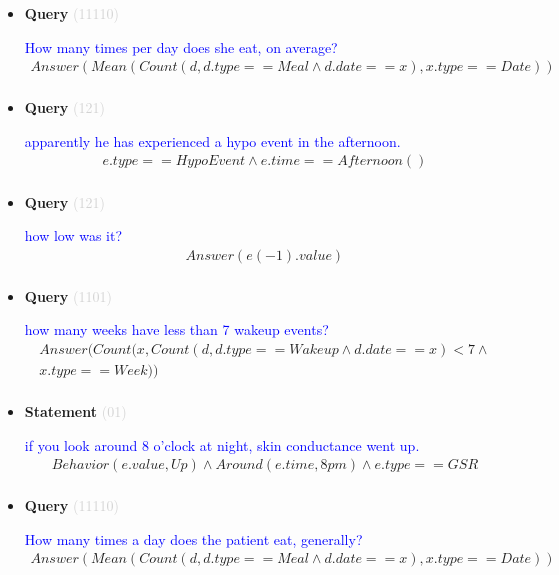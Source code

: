 \documentclass[11pt]{article}
\newcommand{\key}[1]{\textcolor{lightgray}{#1}}
\newcounter{CQuery}
\newcounter{CStatement}
\begin{document}
\begin{itemize}
\item
\textbf{Query\theCQuery} \key{(11110)} \addtocounter{CQuery}{1}
\textcolor{blue}{ How many times per day does she eat, on average? }
\begin{multline*}
Answer(Mean(Count(d, d.type==Meal \wedge d.date==x), x.type==Date)) \\ 
\end{multline*}


\item
\textbf{Query\theCQuery} \key{(121)} \addtocounter{CQuery}{1}
\textcolor{blue}{ apparently he has experienced a hypo event in the afternoon. }
\begin{multline*}
e.type==HypoEvent \wedge e.time==Afternoon() \\ 
\end{multline*}


\item
\textbf{Query\theCQuery} \key{(121)} \addtocounter{CQuery}{1}
\textcolor{blue}{ how low was it? }
\begin{multline*}
Answer(e(-1).value) \\ 
\end{multline*}


\item
\textbf{Query\theCQuery} \key{(1101)} \addtocounter{CQuery}{1}
\textcolor{blue}{ how many weeks have less than 7 wakeup events? }
\begin{multline*}
Answer(Count(x, Count(d, d.type==Wakeup \wedge d.date==x)<7 \wedge \\ 
x.type==Week)) \\ 
\end{multline*}


\item
\textbf{Statement\theCStatement} \key{(01)} \addtocounter{CStatement}{1}
\textcolor{blue}{ if you look around 8 o'clock at night, skin conductance went up. }
\begin{multline*}
Behavior(e.value, Up) \wedge Around(e.time, 8pm) \wedge e.type==GSR \\ 
\end{multline*}


\item
\textbf{Query\theCQuery} \key{(11110)} \addtocounter{CQuery}{1}
\textcolor{blue}{ How many times a day does the patient eat, generally? }
\begin{multline*}
Answer(Mean(Count(d, d.type==Meal \wedge d.date==x), x.type==Date)) \\ 
\end{multline*}



\end{itemize}
\end{document}
